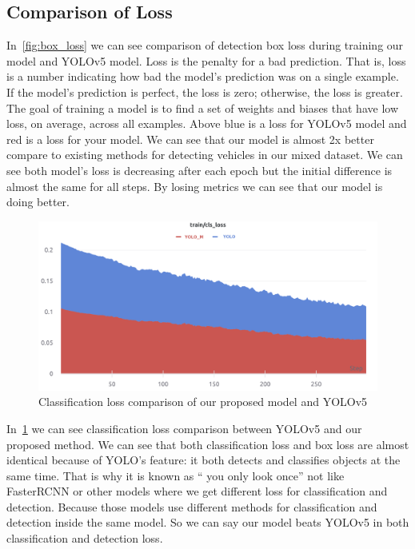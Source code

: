 \subsection{Comparison of Loss }
In~\ref{fig:box_loss} we can see comparison of detection box loss during training our model and YOLOv5 model. Loss is the penalty for a bad prediction. That is, loss is a number indicating how bad the model's prediction was on a single example. If the model's prediction is perfect, the loss is zero; otherwise, the loss is greater. The goal of training a model is to find a set of weights and biases that have low loss, on average, across all examples. Above blue is a loss for YOLOv5 model and red is a loss for your model. We can see that our model is almost 2x better compare to existing methods for detecting vehicles in our mixed dataset. We can see both model's loss is decreasing after each epoch but the initial difference is almost the same for all steps. By losing metrics we can see that our model is doing better.
\newpage
\begin{figure}[h]
    \centering
    \includegraphics[max width=\textwidth]{images/ours/cls-loss.png}
   \caption[Classification Loss comparison of YOLOv5 and Our Proposed Model]{ Classification loss comparison of our proposed model and YOLOv5}
    \label{fig:cls_loss}
\end{figure}

In~\ref{fig:cls_loss} we can see classification loss comparison between YOLOv5 and our proposed method. We can see that both classification loss and box loss are almost identical because of YOLO's feature: it both detects and classifies objects at the same time. That is why it is known as “ you only look once” not like FasterRCNN or other models where we get different loss for classification and detection. Because those models use different methods for classification and detection inside the same model. So we can say our model beats YOLOv5 in both classification and detection loss. 

